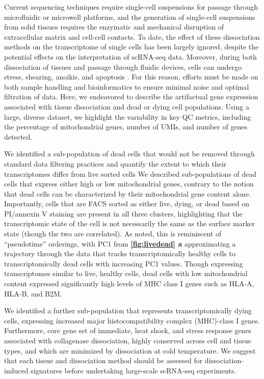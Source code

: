 Current sequencing techniques require single-cell suspensions for passage through microfluidic or microwell platforms, and the generation of single-cell suspensions from solid tissues requires the enzymatic and mechanical disruption of extracellular matrix and cell-cell contacts. To date, the effect of these dissociation methods on the transcriptome of single cells has been largely ignored, despite the potential effects on the interpretation of scRNA-seq data. Moreover, during both dissociation of tissues and passage through fluidic devices, cells can undergo stress, shearing, anoikis, and apoptosis \cite{aljanahi2018introduction}. For this reason, efforts must be made on both sample handling and bioinformatics to ensure minimal noise and optimal filtration of data. Here, we endeavored to describe the artifactual gene expression associated with tissue dissociation and dead or dying cell populations. Using a large, diverse dataset, we highlight the variability in key QC metrics, including the percentage of mitochondrial genes, number of UMIs, and number of genes detected. 

We identified a sub-population of dead cells that would not be removed through standard data filtering practices and quantify the extent to which their transcriptomes differ from live sorted cells
We described sub-populations of dead cells that express either high or low mitochondrial genes, contrary to the notion that dead cells can be characterized by their mitochondrial gene content alone. Importantly, cells that are FACS sorted as either live, dying, or dead based on PI/annexin V staining are present in all three clusters, highlighting that the transcriptomic state of the cell is not necessarily the same as the surface marker state (though the two are correlated). As noted, this is reminiscent of ``pseudotime'' orderings, with PC1 from \textbf{\autoref{fig:livedead} a}  approximating a trajectory through the data that tracks transcriptomically healthy cells to transcriptomically dead cells with increasing PC1 values. Though expressing transcriptomes similar to live, healthy cells, dead cells with low mitochondrial content expressed significantly high levels of MHC class I genes such as HLA-A, HLA-B, and B2M.

 We identified a further sub-population that represents transcriptomically dying cells, expressing increased major histocompatibility complex (MHC)-class I genes. Furthermore, core gene set of immediate, heat shock, and stress response genes associated with collagenase dissociation, highly conserved across cell and tissue types, and which are minimized by dissociation at cold temperature. We suggest that each tissue and dissociation method should be assessed for dissociation-induced signatures before undertaking large-scale scRNA-seq experiments.






